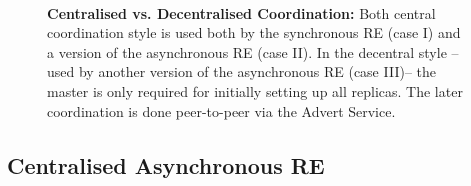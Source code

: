 \documentclass{rspublic}
\newcommand{\athotanote}[1]{ {\textcolor{green} { ***athota: #1 }}}
\newcommand{\athotanote}[1]{}
\begin{document}
\begin{figure}%
\centering
{}\qquad
{}\\
\caption{\textbf{Centralised vs. Decentralised Coordination:} Both central coordination style
is used both by the synchronous RE (case I) and a version of the asynchronous RE (case II). 
In the decentral style -- used by another version of the asynchronous RE (case III)-- the master is only required
for initially setting up all replicas. The later coordination is done peer-to-peer via the Advert Service.}
\label{fig:coordination}
\end{figure}


\subsection{Centralised Asynchronous RE}


\end{document}
